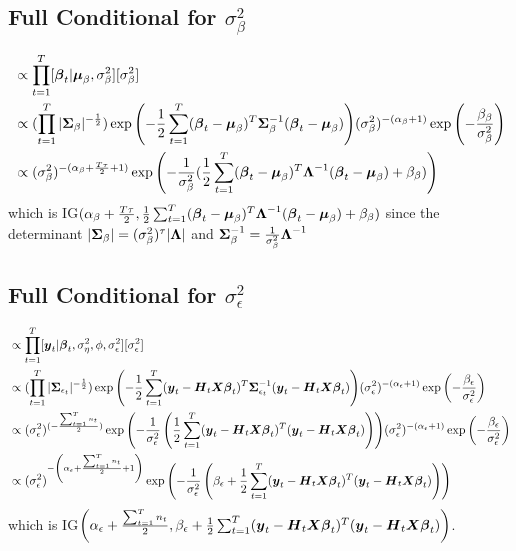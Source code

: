 \documentclass[fleqn]{article}
\def\bm#1{\mbox{\boldmath $#1$}}
\begin{document}
\subsection{Full Conditional for $\sigma^2_\beta$}
%
\begin{align*}
[\sigma^2_\beta | \cdot] & \propto \prod_{t = 1}^T [\bm{\beta}_t | \bm{\mu}_\beta, \sigma^2_\beta] [\sigma^2_\beta]\\
%
& \propto (\prod_{t = 1}^T |\bm{\Sigma}_\beta|^{ - \frac{1} {2}}) \exp{ \left( - \frac{1} {2} \sum_{t = 1}^T (\bm{\beta}_t - \bm{\mu}_\beta)^T \bm{\Sigma}_\beta^{ - 1} (\bm{\beta}_t - \bm{\mu}_\beta) \right) } (\sigma^2_\beta)^{ - (\alpha_\beta + 1)} \exp{ \left( - \frac{\beta_\beta} {\sigma^2_\beta} \right) }\\
%
& \propto (\sigma^2_\beta)^{ - (\alpha_\beta + \frac{T \tau} {2} + 1)} \exp{ \left( - \frac{1} {\sigma^2_\beta} (\frac{1} {2} \sum_{t = 1}^T (\bm{\beta}_t - \bm{\mu}_\beta)^T \bm{\Lambda}^{ - 1} (\bm{\beta}_t - \bm{\mu}_\beta) + \beta_\beta) \right) }
\end{align*}
%
which is IG$(\alpha_\beta + \frac{T \tau} {2}, \frac{1} {2} \sum_{t = 1}^T (\bm{\beta}_t - \bm{\mu}_\beta)^T \bm{\Lambda}^{ - 1} (\bm{\beta}_t - \bm{\mu}_\beta) + \beta_\beta)$ since the determinant $|\bm{\Sigma}_\beta| = (\sigma^2_\beta)^\tau | \bm{\Lambda} |$ and $\bm{\Sigma}_\beta^{ - 1} = \frac{1} {\sigma^2_\beta} \bm{\Lambda}^{ - 1} $
%
\subsection{Full Conditional for $\sigma^2_\epsilon$}
%
\begin{align*}
[\sigma^2_\epsilon | \cdot] & \propto \prod_{t = 1}^T [\bm{y}_t | \bm{\beta}_t, \sigma^2_\eta, \phi, \sigma^2_\epsilon] [\sigma^2_\epsilon]\\
%
& \propto (\prod_{t = 1}^T | \bm{\Sigma}_{\epsilon_t} |^{ - \frac{1} {2}}) \exp{ \left( - \frac{1} {2} \sum_{t = 1}^T (\bm{y}_t - \bm{H}_t \bm{X} \bm{\beta}_t)^T \bm{\Sigma}_{\epsilon_t}^{ - 1} (\bm{y}_t - \bm{H}_t \bm{X} \bm{\beta}_t) \right) } (\sigma^2_\epsilon)^{ - \left( \alpha_\epsilon + 1 \right) } \exp{ \left( - \frac{\beta_\epsilon} {\sigma^2_\epsilon} \right) }\\
%
& \propto (\sigma^2_\epsilon)^{( - \frac{\sum_{t = 1}^T n_t} {2})} \exp{ \left( - \frac{1} {\sigma^2_\epsilon} \left( \frac{1} {2} \sum_{t = 1}^T (\bm{y}_t - \bm{H}_t \bm{X} \bm{\beta}_t)^T (\bm{y}_t - \bm{H}_t \bm{X} \bm{\beta}_t) \right) \right) } (\sigma^2_\epsilon)^{ - \left( \alpha_\epsilon + 1 \right) } \exp{ \left( - \frac{\beta_\epsilon} {\sigma^2_\epsilon} \right) }\\
%
& \propto (\sigma^2_\epsilon)^{ - \left( \alpha_\epsilon + \frac{\sum_{t = 1}^T n_t} {2} + 1 \right)} \exp{ \left( - \frac{1} {\sigma^2_\epsilon} \left( \beta_\epsilon + \frac{1} {2} \sum_{t = 1}^T (\bm{y}_t - \bm{H}_t \bm{X} \bm{\beta}_t)^T (\bm{y}_t - \bm{H}_t \bm{X} \bm{\beta}_t) \right) \right) }\\
%
\end{align*}
% 
which is IG$ \left( \alpha_\epsilon + \frac{\sum_{t = 1}^T n_t} {2}, \beta_\epsilon + \frac{1} {2} \sum_{t = 1}^T (\bm{y}_t - \bm{H}_t \bm{X} \bm{\beta}_t)^T (\bm{y}_t - \bm{H}_t \bm{X} \bm{\beta}_t) \right)$.  
%
\end{document}
